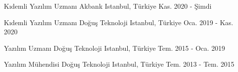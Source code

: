 

\begin{cventries}

  \cventry
    {Kıdemli Yazılım Uzmanı} %
    {Akbank} %
    {Istanbul, Türkiye} %
    {Kas. 2020 - Şimdi} %
    {}

  \cventry
    {Kıdemli Yazılım Uzmanı} %
    {Doğuş Teknoloji} %
    {Istanbul, Türkiye} %
    {Oca. 2019 - Kas. 2020} %
    {}

  \cventry
    {Yazılım Uzmanı} %
    {Doğuş Teknoloji} %
    {Istanbul, Türkiye} %
    {Tem. 2015 - Oca. 2019} %
    {}

  \cventry
    {Yazılım Mühendisi} %
    {Doğuş Teknoloji} %
    {Istanbul, Türkiye} %
    {Tem. 2013 - Tem. 2015} %
    {}

\end{cventries}
